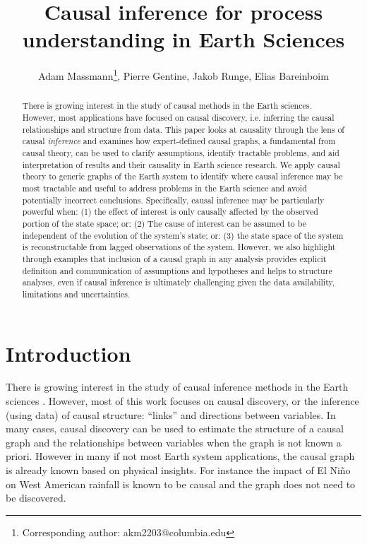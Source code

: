 \documentclass[12pt]{article}
\begin{document}
\title{Causal inference for process understanding in Earth Sciences}

\author{Adam Massmann\thanks{Corresponding author:
    akm2203@columbia.edu}, Pierre Gentine, Jakob Runge, Elias Bareinboim}

\maketitle
\begin{abstract}
  There is growing interest in the study of causal methods in the
  Earth sciences. However, most applications have focused on causal
  discovery, i.e. inferring the causal relationships and structure
  from data. This paper looks at causality through the lens of causal
  {\it inference} and examines how expert-defined causal graphs, a
  fundamental from causal theory, can be used to clarify assumptions,
  identify tractable problems, and aid interpretation of results and
  their causality in Earth science research. We apply causal theory to
  generic graphs of the Earth system to identify where causal
  inference may be most tractable and useful to address problems in
  the Earth science and avoid potentially incorrect
  conclusions. Specifically, causal inference may be particularly
  powerful when: (1) the effect of interest is only causally affected
  by the observed portion of the state space; or: (2) The cause of
  interest can be assumed to be independent of the evolution of the
  system’s state; or: (3) the state space of the system is
  reconstructable from lagged observations of the system. However, we
  also highlight through examples that inclusion of a causal graph in
  any analysis provides explicit definition and communication of
  assumptions and hypotheses and helps to structure analyses, even if
  causal inference is ultimately challenging given the data
  availability, limitations and uncertainties.
\end{abstract}

\section{Introduction}

There is growing interest in the study of causal inference methods in
the Earth sciences \citep[e.g.,][]{salvucci2002, ebert-uphoff2012,
  kretschmer2016,
  samarasinghe2020,runge-causal-timeseries,runge2019inferring,goodwell-causality-2020}. However,
most of this work focuses on causal discovery, or the inference (using
data) of causal structure: ``links'' and directions between
variables. In many cases, causal discovery can be used to estimate the
structure of a causal graph and the relationships between variables
when the graph is not known a priori. However in many if not most
Earth system applications, the causal graph is already known based on
physical insights. For instance the impact of El Ni\~{n}o on West
American rainfall is known to be causal and the graph does not need to
be discovered.
\end{document}
